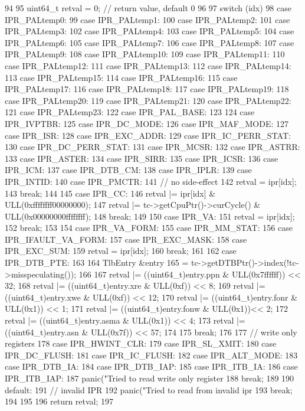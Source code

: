 \begin{DoxyCode}
94 {
95     uint64_t retval = 0;        // return value, default 0
96 
97     switch (idx) {
98       case IPR_PALtemp0:
99       case IPR_PALtemp1:
100       case IPR_PALtemp2:
101       case IPR_PALtemp3:
102       case IPR_PALtemp4:
103       case IPR_PALtemp5:
104       case IPR_PALtemp6:
105       case IPR_PALtemp7:
106       case IPR_PALtemp8:
107       case IPR_PALtemp9:
108       case IPR_PALtemp10:
109       case IPR_PALtemp11:
110       case IPR_PALtemp12:
111       case IPR_PALtemp13:
112       case IPR_PALtemp14:
113       case IPR_PALtemp15:
114       case IPR_PALtemp16:
115       case IPR_PALtemp17:
116       case IPR_PALtemp18:
117       case IPR_PALtemp19:
118       case IPR_PALtemp20:
119       case IPR_PALtemp21:
120       case IPR_PALtemp22:
121       case IPR_PALtemp23:
122       case IPR_PAL_BASE:
123 
124       case IPR_IVPTBR:
125       case IPR_DC_MODE:
126       case IPR_MAF_MODE:
127       case IPR_ISR:
128       case IPR_EXC_ADDR:
129       case IPR_IC_PERR_STAT:
130       case IPR_DC_PERR_STAT:
131       case IPR_MCSR:
132       case IPR_ASTRR:
133       case IPR_ASTER:
134       case IPR_SIRR:
135       case IPR_ICSR:
136       case IPR_ICM:
137       case IPR_DTB_CM:
138       case IPR_IPLR:
139       case IPR_INTID:
140       case IPR_PMCTR:
141         // no side-effect
142         retval = ipr[idx];
143         break;
144 
145       case IPR_CC:
146         retval |= ipr[idx] & ULL(0xffffffff00000000);
147         retval |= tc->getCpuPtr()->curCycle()  & ULL(0x00000000ffffffff);
148         break;
149 
150       case IPR_VA:
151         retval = ipr[idx];
152         break;
153 
154       case IPR_VA_FORM:
155       case IPR_MM_STAT:
156       case IPR_IFAULT_VA_FORM:
157       case IPR_EXC_MASK:
158       case IPR_EXC_SUM:
159         retval = ipr[idx];
160         break;
161 
162       case IPR_DTB_PTE:
163         {
164             TlbEntry &entry
165                 = tc->getDTBPtr()->index(!tc->misspeculating());
166 
167             retval |= ((uint64_t)entry.ppn & ULL(0x7ffffff)) << 32;
168             retval |= ((uint64_t)entry.xre & ULL(0xf)) << 8;
169             retval |= ((uint64_t)entry.xwe & ULL(0xf)) << 12;
170             retval |= ((uint64_t)entry.fonr & ULL(0x1)) << 1;
171             retval |= ((uint64_t)entry.fonw & ULL(0x1))<< 2;
172             retval |= ((uint64_t)entry.asma & ULL(0x1)) << 4;
173             retval |= ((uint64_t)entry.asn & ULL(0x7f)) << 57;
174         }
175         break;
176 
177         // write only registers
178       case IPR_HWINT_CLR:
179       case IPR_SL_XMIT:
180       case IPR_DC_FLUSH:
181       case IPR_IC_FLUSH:
182       case IPR_ALT_MODE:
183       case IPR_DTB_IA:
184       case IPR_DTB_IAP:
185       case IPR_ITB_IA:
186       case IPR_ITB_IAP:
187         panic("Tried to read write only register %
188         break;
189 
190       default:
191         // invalid IPR
192         panic("Tried to read from invalid ipr %
193         break;
194     }
195 
196     return retval;
197 }
\end{DoxyCode}
